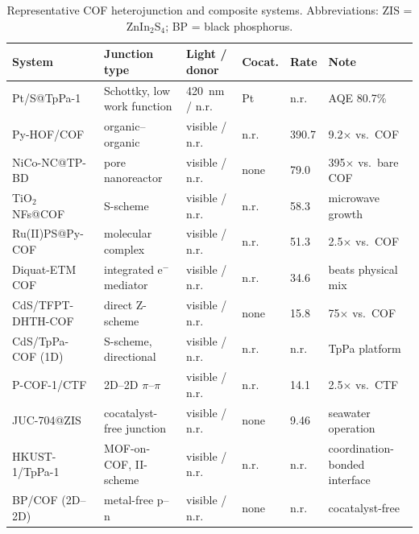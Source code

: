 \begin{table}[t]
  \centering
  \caption{Representative COF heterojunction and composite systems.
  Abbreviations: ZIS = ZnIn$_2$S$_4$; BP = black phosphorus.}
  \label{tab:hetero}
  \small
  \begin{tabular}{P{3.3cm} P{2.4cm} P{2.2cm} P{1.6cm} P{1.7cm} P{2.2cm}}
    \toprule
    System & Junction type & Light / donor & Cocat. & Rate & Note \\
    \midrule
    Pt/S@TpPa-1~\cite{qiu2026atomically}
      & Schottky, low work function & 420~nm / n.r. & Pt & n.r.
      & AQE 80.7\% \\
    Py-HOF/COF~\cite{gao20242d}
      & organic--organic & visible / n.r. & n.r. & 390.7
      & 9.2$\times$ vs.\ COF \\
    NiCo-NC@TP-BD~\cite{pan2025reducing}
      & pore nanoreactor & visible / n.r. & none & 79.0
      & 395$\times$ vs.\ bare COF \\
    TiO$_2$ NFs@COF~\cite{gao2025microwavex}
      & S-scheme & visible / n.r. & n.r. & 58.3 & microwave growth \\
    Ru(II)PS@Py-COF~\cite{zhang2023stable}
      & molecular complex & visible / n.r. & n.r. & 51.3
      & 2.5$\times$ vs.\ COF \\
    Diquat-ETM COF~\cite{mi2021covalent}
      & integrated e$^-$ mediator & visible / n.r. & n.r. & 34.6
      & beats physical mix \\
    CdS/TFPT-DHTH-COF~\cite{zhang2024a}
      & direct Z-scheme & visible / n.r. & none & 15.8
      & 75$\times$ vs.\ COF \\
    CdS/TpPa-COF (1D)~\cite{fan2026one}
      & S-scheme, directional & visible / n.r. & n.r. & n.r.
      & TpPa platform \\
    P-COF-1/CTF~\cite{xu20202d}
      & 2D--2D $\pi$--$\pi$ & visible / n.r. & n.r. & 14.1
      & 2.5$\times$ vs.\ CTF \\
    JUC-704@ZIS~\cite{zhang2025dual}
      & cocatalyst-free junction & visible / n.r. & none & 9.46
      & seawater operation \\
    HKUST-1/TpPa-1~\cite{ma2024ii}
      & MOF-on-COF, II-scheme & visible / n.r. & n.r. & n.r.
      & coordination-bonded interface \\
    BP/COF (2D--2D)~\cite{yan2023metal}
      & metal-free p--n & visible / n.r. & none & n.r.
      & cocatalyst-free \\
    \bottomrule
  \end{tabular}
\end{table}

